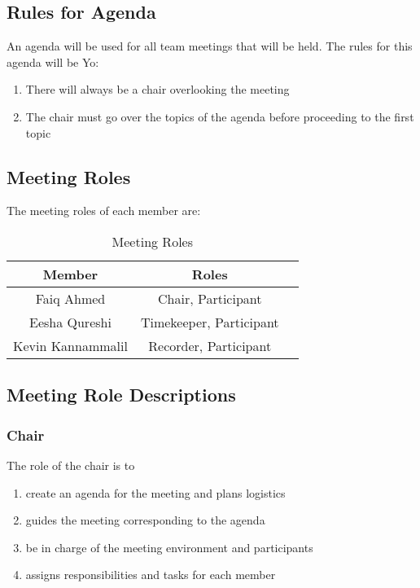 \documentclass[12pt,letterpaper]{article}
\begin{document}
\subsection{Rules for Agenda}

An agenda will be used for all team meetings that will be held. The rules for this agenda will be Yo: 

\begin{enumerate}
    \item There will always be a chair overlooking the meeting
    \item The chair must go over the topics of the agenda before proceeding to the first topic
\end{enumerate}

\subsection{Meeting Roles}

The meeting roles of each member are: 

\begin{table}[H]
    \centering
    \begin{tabular}{ |c|c|c| } 
    \hline
    Member & Roles \\
    \hline
    Faiq Ahmed & Chair, Participant\\
    Eesha Qureshi & Timekeeper, Participant \\
    Kevin Kannammalil & Recorder, Participant \\
    \hline
    \end{tabular}
    \caption{Meeting Roles}
    \label{tab:meetingroles}
\end{table}

\subsection{Meeting Role Descriptions}

\subsubsection{Chair}
The role of the chair is to
\begin{enumerate}
    \item create an agenda for the meeting and plans logistics
    \item guides the meeting corresponding to the agenda
    \item be in charge of the meeting environment and participants
    \item assigns responsibilities and tasks for each member
\end{enumerate}
\end{document}
